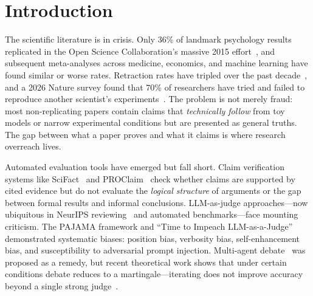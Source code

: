 \documentclass[11pt]{article}
\begin{document}
\begin{abstract}
We report these findings transparently; the verification backend is a work in progress, and honest measurement is a prerequisite to improvement.
Code and all experimental artifacts are available at \url{https://github.com/vishk23/arbiter}. All experiments were conducted in April 2026 using frontier models available at that time (GPT-5.4, Claude Opus 4.6, Grok~4.20). Debate agents were run at default temperature (0.7--1.0 depending on provider); judge calls at temperature 0. Gate model: GPT-5.4-mini at temperature 0. The AI Layoff Trap debate (9 agents, 6 rounds, 3 providers) required approximately 180 API calls. We report a single run; variance across random seeds has not been measured.
\end{abstract}

\section{Introduction}
\label{sec:intro}

The scientific literature is in crisis.
Only 36\% of landmark psychology results replicated in the Open Science Collaboration's massive 2015 effort~\cite{osc2015}, and subsequent meta-analyses across medicine, economics, and machine learning have found similar or worse rates.
Retraction rates have tripled over the past decade~\cite{retraction2024}, and a 2026 Nature survey found that 70\% of researchers have tried and failed to reproduce another scientist's experiments~\cite{nature2026}.
The problem is not merely fraud: most non-replicating papers contain claims that \emph{technically follow} from toy models or narrow experimental conditions but are presented as general truths.
The gap between what a paper proves and what it claims is where research overreach lives.

Automated evaluation tools have emerged but fall short.
Claim verification systems like SciFact~\cite{wadden2020} and PROClaim~\cite{proclaim2026} check whether claims are supported by cited evidence but do not evaluate the \emph{logical structure} of arguments or the gap between formal results and informal conclusions.
LLM-as-judge approaches---now ubiquitous in NeurIPS reviewing~\cite{neurips2024} and automated benchmarks---face mounting criticism.
The PAJAMA framework and ``Time to Impeach LLM-as-a-Judge''~\cite{pajama2025} demonstrated systematic biases: position bias, verbosity bias, self-enhancement bias, and susceptibility to adversarial prompt injection.
Multi-agent debate~\cite{du2023} was proposed as a remedy, but recent theoretical work shows that under certain conditions debate reduces to a martingale---iterating does not improve accuracy beyond a single strong judge~\cite{debateskepticism2025}.
\end{document}

